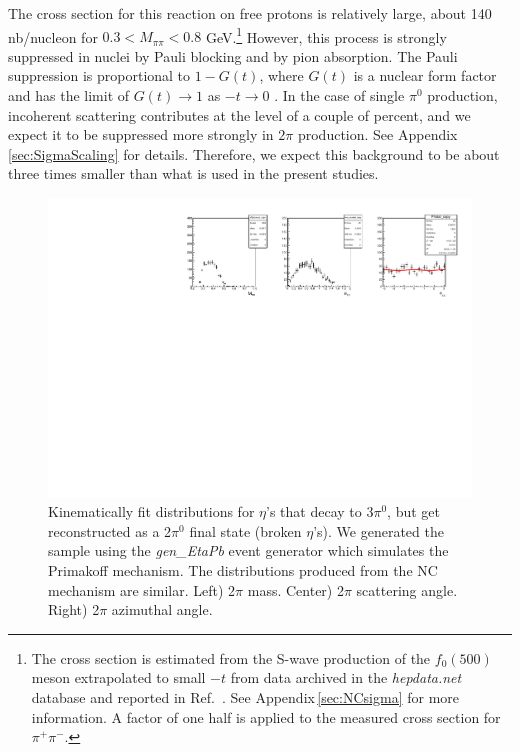 The cross section for this reaction on free protons is relatively
large, about 140 nb/nucleon for $0.3 < M_{\pi\pi} < 0.8$
GeV.\footnote{The cross section is estimated from the S-wave
  production of the $f_0(500)$ meson extrapolated to small $-t$ from
  data archived in the {\em hepdata.net} database and reported in
  Ref.~\cite{Battaglieri:2009aa}. See Appendix\,\ref{sec:NCsigma} for
  more information. A factor of one half is applied to the measured
  cross section for $\pi^+\pi^-$.} However, this process is strongly
suppressed in nuclei by Pauli blocking and by pion absorption. The
Pauli suppression is proportional to $1-G(t)$, where $G(t)$ is a
nuclear form factor and has the limit of $G(t)\to1$ as $-t\to0$
\cite{Gevorkyan:2009ge,primex_inc}. In the case of single $\pi^0$
production, incoherent scattering contributes at the level of a couple
of percent, and we expect it to be suppressed more strongly in $2\pi$
production. See Appendix\,\ref{sec:SigmaScaling} for
details. Therefore, we expect this background to be about three times
smaller than what is used in the present studies.

\begin{figure}[tbp]
\begin{center}
\includegraphics[width=16cm,clip=true]{figures/BrokenEtasPrim.pdf}
\caption{Kinematically fit distributions for $\eta$'s that decay to 3$\pi^0$, but get reconstructed as a 2$\pi^0$ final state (broken $\eta$'s).
We generated the sample using the {\em gen\_EtaPb} event generator which simulates the Primakoff mechanism. The distributions produced from the NC mechanism are similar. 
Left) 2$\pi$ mass. Center) 2$\pi$ scattering angle. Right) 2$\pi$ azimuthal angle.
\label{fig:eta}}
\end{center} 
\end{figure}




